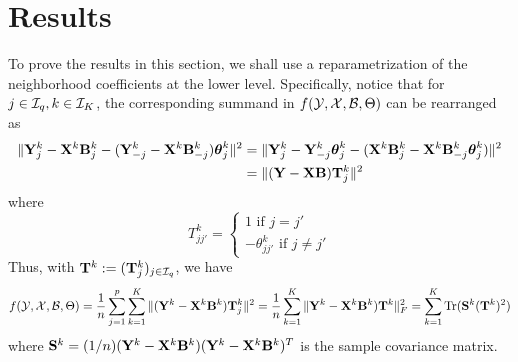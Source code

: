 \documentclass[12pt, letterpaper]{article}
\DeclareMathOperator*{\Tr}{Tr}
\numberwithin{equation}{section}
\begin{document}
\section{Results}
To prove the results in this section, we shall use a reparametrization of the neighborhood coefficients at the lower level. Specifically, notice that for $j \in {\cal{I}}_q, k \in {\cal{I}}_K$, the corresponding summand in $f({\cal{Y}}, {\cal{X}}, {\cal{B}}, \Theta)$ can be rearranged as
%
\begin{align*}
\| {\mathbf{Y}}^k_j - {\mathbf{X}}^k {\mathbf{B}}_j^k - ({\mathbf{Y}}_{-j}^k - {\mathbf{X}}^k {\mathbf{B}}_{-j}^k) {\boldsymbol{\theta}}_j^k \|^2 &=
\| {\mathbf{Y}}^k_j - {\mathbf{Y}}_{-j}^k {\boldsymbol{\theta}}_j^k - ({\mathbf{X}}^k {\mathbf{B}}_j^k -{\mathbf{X}}^k {\mathbf{B}}_{-j}^k {\boldsymbol{\theta}}_j^k) \|^2 \\
&= \| ( {\mathbf{Y}} - {\mathbf{X}} {\mathbf{B}} ) {\mathbf{T}}_j^k \|^2
\end{align*}
%
where
%
$$
T_{jj'}^k = \begin{cases}
1 \text{ if } j = j'\\
- \theta_{jj'}^k \text{ if } j \neq j'
\end{cases}
$$
%
Thus, with ${\mathbf{T}}^k := ({\mathbf{T}}_j^k)_{j \in {\cal{I}}_q}$, we have
$$
f( \cY, \cX, \cB, \Theta) = \frac{1}{n} \sum_{j=1}^p \sum_{k=1}^K \| ( \bfY^k - \bfX^k \bfB^k ) \bfT_j^k \|^2
= \frac{1}{n} \sum_{k=1}^K \| \bfY^k - \bfX^k \bfB^k ) \bfT^k \|_F^2
= \sum_{k=1}^K \Tr (\bfS^k (\bfT^k)^2 )
$$
%
where ${\mathbf{S}}^k = (1/n) ({\mathbf{Y}}^k - {\mathbf{X}}^k {\mathbf{B}}^k) ({\mathbf{Y}}^k - {\mathbf{X}}^k {\mathbf{B}}^k)^T$ is the sample covariance matrix.
\end{document}
